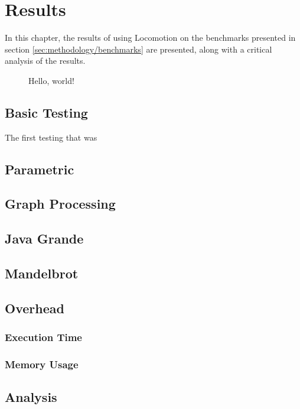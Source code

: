 \chapter{Results} \label{chp:results}
In this chapter, the results of using Locomotion on the benchmarks presented in section \ref{sec:methodology/benchmarks} are presented, along with a critical analysis of the results.

\begin{figure}
	\centering
	\caption{Hello, world!}
\end{figure}


\section{Basic Testing} \label{sec:results/basic}
The first testing that was  

\section{Parametric} \label{sec:results/parametric}

\section{Graph Processing} \label{sec:results/graph}

\section{Java Grande} \label{sec:results/grande}

\section{Mandelbrot} \label{sec:results/mandelbrot}

\section{Overhead} \label{sec:results/overhead}
	\subsection{Execution Time} \label{sec:results/overhead/time}
	
	\subsection{Memory Usage} \label{sec:results/overhead/memory}

\section{Analysis} \label{sec:results/analysis}